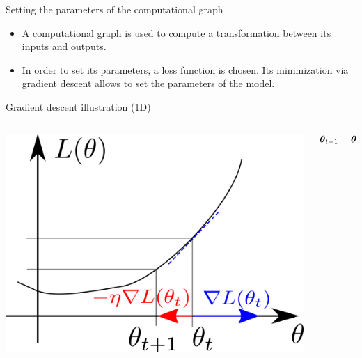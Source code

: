 \documentclass[xcolor=pdftex,dvipsnames,table,mathserif]{beamer}
\begin{document}
\begin{frame}{Setting the parameters of the computational graph}

  \begin{itemize}
  \item A \alert{computational graph} is used to compute a transformation between its inputs and outputs.
  \item In order to set its parameters, a loss function is chosen. Its minimization via gradient descent allows to set the parameters of the model.



\end{itemize}

\end{frame}


\begin{frame}{Gradient descent illustration (1D)}

\begin{columns}
  \begin{column}{.5\textwidth}
    \includegraphics[width=\textwidth]{gradient_descent}
  \end{column}

  \begin{column}{.5\textwidth}
    \[
    \boldsymbol{\theta}_{t+1} = \boldsymbol{\theta}_t - \eta\nabla L(\boldsymbol{\theta}_t)
    \]
  \end{column}
\end{columns}

\end{frame}
\end{document}
